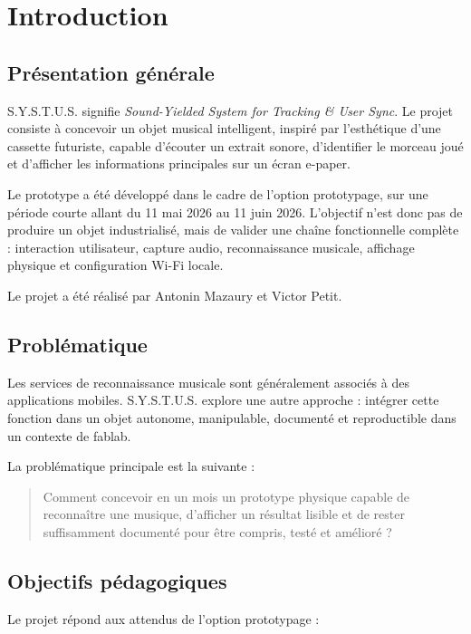 \section{Introduction}

\subsection{Présentation générale}

S.Y.S.T.U.S. signifie \textit{Sound-Yielded System for Tracking \& User Sync}.
Le projet consiste à concevoir un objet musical intelligent, inspiré par
l'esthétique d'une cassette futuriste, capable d'écouter un extrait sonore,
d'identifier le morceau joué et d'afficher les informations principales sur un
écran e-paper.

Le prototype a été développé dans le cadre de l'option prototypage, sur une
période courte allant du 11 mai 2026 au 11 juin 2026. L'objectif n'est donc pas
de produire un objet industrialisé, mais de valider une chaîne fonctionnelle
complète : interaction utilisateur, capture audio, reconnaissance musicale,
affichage physique et configuration Wi-Fi locale.

Le projet a été réalisé par Antonin Mazaury et Victor Petit.

\subsection{Problématique}

Les services de reconnaissance musicale sont généralement associés à des
applications mobiles. S.Y.S.T.U.S. explore une autre approche : intégrer cette
fonction dans un objet autonome, manipulable, documenté et reproductible dans un
contexte de fablab.

La problématique principale est la suivante :

\begin{quote}
Comment concevoir en un mois un prototype physique capable de reconnaître une
musique, d'afficher un résultat lisible et de rester suffisamment documenté pour
être compris, testé et amélioré ?
\end{quote}

\subsection{Objectifs pédagogiques}

Le projet répond aux attendus de l'option prototypage :

